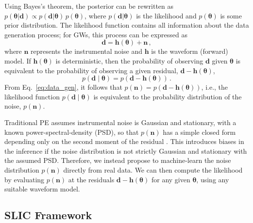 \documentclass[twocolumn]{aastex631}
\begin{document}
Using Bayes's theorem, the posterior can be rewritten as $p(\boldsymbol{\theta}|\boldsymbol{d}) \propto p(\boldsymbol{d}|\boldsymbol{\theta})\, p(\boldsymbol{\theta})$, where $p(\boldsymbol{d}|\boldsymbol{\theta})$ is the likelihood and $p(\boldsymbol{\theta})$ is some prior distribution. The likelihood function contains all information about the data generation process; for GWs, this process can be expressed as
\begin{equation}
\label{eq:data_gen}
    \boldsymbol{d} = \boldsymbol{h}(\boldsymbol{\theta}) + \boldsymbol{n}\, ,
\end{equation}
where $\boldsymbol{n}$ represents the instrumental noise and $\boldsymbol{h}$ is the waveform (forward) model. If $ \boldsymbol{h}(\boldsymbol{\theta})$ is deterministic, then the probability of observing $\boldsymbol{d}$ given $ \boldsymbol{\theta} $ is equivalent to the probability of observing a given residual, $ \boldsymbol{d} - \boldsymbol{h}(\boldsymbol{\theta})$,
\begin{equation} \label{eq:likelihood}
p(\boldsymbol{d} \mid \boldsymbol{\theta}) = p(\boldsymbol{d} - \boldsymbol{h}(\boldsymbol{\theta}))\, .
\end{equation}
From Eq.~\eqref{eq:data_gen}, it follows that $p(\boldsymbol{n}) = p(\boldsymbol{d} - \boldsymbol{h}(\boldsymbol{\theta}))$, i.e., the likelihood function $p(\boldsymbol{d} \mid \boldsymbol{\theta})$ is equivalent to the probability distribution of the noise, $p(\boldsymbol{n})$.

Traditional PE assumes instrumental noise is Gaussian and stationary, with a known power-spectral-density (PSD), so that $p(\mathbf{n})$ has a simple closed form depending only on the second moment of the residual \citep{LIGOScientific:2019hgc}.
This introduces biases in the inference if the noise distribution is not strictly Gaussian and stationary with the assumed PSD. Therefore, we instead propose to machine-learn the noise distribution $p(\boldsymbol{n})$ directly from real data. We can then compute the likelihood by evaluating $p(\boldsymbol{n})$ at the residuals $\boldsymbol{d} - \boldsymbol{h}(\boldsymbol{\theta})$ for any given $\boldsymbol{\theta}$, using any suitable waveform model.


\subsection{SLIC Framework}
\label{sec:slic}
\end{document}
